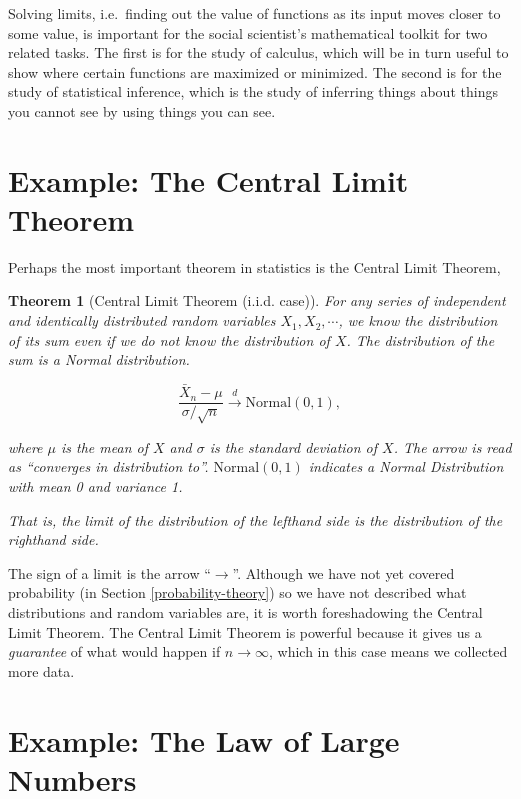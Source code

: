 \documentclass[]{book}
\newtheorem{theorem}{Theorem}[chapter]
\theoremstyle{definition}
\theoremstyle{definition}
\theoremstyle{definition}
\theoremstyle{remark}
\begin{document}
Solving limits, i.e.~finding out the value of functions as its input moves closer to some value, is important for the social scientist's mathematical toolkit for two related tasks. The first is for the study of calculus, which will be in turn useful to show where certain functions are maximized or minimized. The second is for the study of statistical inference, which is the study of inferring things about things you cannot see by using things you can see.

\hypertarget{example-the-central-limit-theorem}{%
\section*{Example: The Central Limit Theorem}\label{example-the-central-limit-theorem}}

Perhaps the most important theorem in statistics is the Central Limit Theorem,

\begin{theorem}[Central Limit Theorem (i.i.d. case)]
\protect\hypertarget{thm:clt-lim}{}{\label{thm:clt-lim} {} }For any series of independent and identically distributed random variables \(X_1, X_2, \cdots\), we know the distribution of its sum even if we do not know the distribution of \(X\). The distribution of the sum is a Normal distribution.

\[\frac{\bar{X}_n - \mu}{\sigma / \sqrt{n}} \xrightarrow{d} \text{Normal}(0, 1),\]

where \(\mu\) is the mean of \(X\) and \(\sigma\) is the standard deviation of \(X\). The arrow is read as ``converges in distribution to''. \(\text{Normal}(0, 1)\) indicates a Normal Distribution with mean 0 and variance 1.

That is, the limit of the distribution of the lefthand side is the distribution of the righthand side.
\end{theorem}

The sign of a limit is the arrow ``\(\rightarrow\)''. Although we have not yet covered probability (in Section \ref{probability-theory}) so we have not described what distributions and random variables are, it is worth foreshadowing the Central Limit Theorem. The Central Limit Theorem is powerful because it gives us a \emph{guarantee} of what would happen if \(n \rightarrow \infty\), which in this case means we collected more data.

\hypertarget{example-the-law-of-large-numbers}{%
\section*{Example: The Law of Large Numbers}\label{example-the-law-of-large-numbers}}
\end{document}
